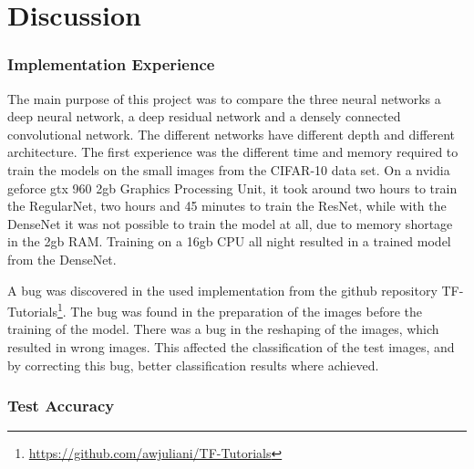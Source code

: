 \chapter{Discussion}
\label{chp:discussion}

\subsection{Implementation Experience}

The main purpose of this project was to compare the three neural networks a deep neural network, a deep residual network and a densely connected convolutional network. The different networks have different depth and different architecture. The first experience was the different time and memory required to train the models on the small images from the CIFAR-10 data set. On a nvidia geforce gtx 960 2gb Graphics Processing Unit, it took around two hours to train the RegularNet, two hours and 45 minutes to train the ResNet, while with the DenseNet it was not possible to train the model at all, due to memory shortage in the 2gb RAM. Training on a 16gb CPU all night resulted in a trained model from the DenseNet.

A bug was discovered in the used implementation from the github repository TF-Tutorials\footnote{\url{https://github.com/awjuliani/TF-Tutorials}}. The bug was found in the preparation of the images before the training of the model. There was a bug in the reshaping of the images, which resulted in wrong images. This affected the classification of the test images, and by correcting this bug, better classification results where achieved.

\subsection{Test Accuracy}

\FloatBarrier

